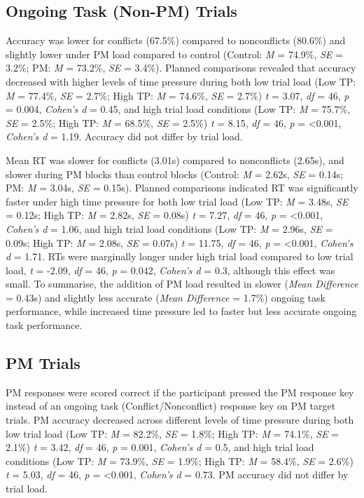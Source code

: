 \documentclass[11pt,]{article}
\begin{document}
\subsection{Ongoing Task (Non-PM)
Trials}\label{ongoing-task-non-pm-trials}

Accuracy was lower for conflicts (67.5\%) compared to nonconflicts
(80.6\%) and slightly lower under PM load compared to control (Control:
\emph{M} = 74.9\%, \emph{SE} = 3.2\%; PM: \emph{M} = 73.2\%, \emph{SE} =
3.4\%). Planned comparisons revealed that accuracy decreased with higher
levels of time pressure during both low trial load (Low TP: \emph{M} =
77.4\%, \emph{SE} = 2.7\%; High TP: \emph{M} = 74.6\%, \emph{SE} =
2.7\%) \emph{t} = 3.07, \emph{df} = 46, \emph{p} = 0.004, \emph{Cohen's
d} = 0.45, and high trial load conditions (Low TP: \emph{M} = 75.7\%,
\emph{SE} = 2.5\%; High TP: \emph{M} = 68.5\%, \emph{SE} = 2.5\%)
\emph{t} = 8.15, \emph{df} = 46, \emph{p} = \textless{}0.001,
\emph{Cohen's d} = 1.19. Accuracy did not differ by trial load.

Mean RT was slower for conflicts (3.01s) compared to nonconflicts
(2.65s), and slower during PM blocks than control blocks (Control:
\emph{M} = 2.62s, \emph{SE} = 0.14s; PM: \emph{M} = 3.04s, \emph{SE} =
0.15s). Planned comparisons indicated RT was significantly faster under
high time pressure for both low trial load (Low TP: \emph{M} = 3.48s,
\emph{SE} = 0.12s; High TP: \emph{M} = 2.82s, \emph{SE} = 0.08s)
\emph{t} = 7.27, \emph{df} = 46, \emph{p} = \textless{}0.001,
\emph{Cohen's d} = 1.06, and high trial load conditions (Low TP:
\emph{M} = 2.96s, \emph{SE} = 0.09s; High TP: \emph{M} = 2.08s,
\emph{SE} = 0.07s) \emph{t} = 11.75, \emph{df} = 46, \emph{p} =
\textless{}0.001, \emph{Cohen's d} = 1.71. RTs were marginally longer
under high trial load compared to low trial load, \emph{t} = -2.09,
\emph{df} = 46, \emph{p} = 0.042, \emph{Cohen's d} = 0.3, although this
effect was small. To summarise, the addition of PM load resulted in
slower (\emph{Mean Difference} = 0.43s) and slightly less accurate
(\emph{Mean Difference} = 1.7\%) ongoing task performance, while
increased time pressure led to faster but less accurate ongoing task
performance.

\subsection{PM Trials}\label{pm-trials}

PM responses were scored correct if the participant pressed the PM
response key instead of an ongoing task (Conflict/Nonconflict) response
key on PM target trials. PM accuracy decreased across different levels
of time pressure during both low trial load (Low TP: \emph{M} = 82.2\%,
\emph{SE} = 1.8\%; High TP: \emph{M} = 74.1\%, \emph{SE} = 2.1\%)
\emph{t} = 3.42, \emph{df} = 46, \emph{p} = 0.001, \emph{Cohen's d} =
0.5, and high trial load conditions (Low TP: \emph{M} = 73.9\%,
\emph{SE} = 1.9\%; High TP: \emph{M} = 58.4\%, \emph{SE} = 2.6\%)
\emph{t} = 5.03, \emph{df} = 46, \emph{p} = \textless{}0.001,
\emph{Cohen's d} = 0.73. PM accuracy did not differ by trial load.
\end{document}
